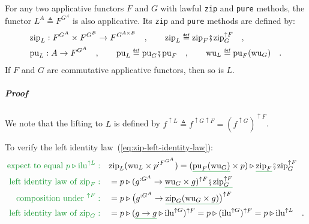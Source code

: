 For any two applicative functors $F$ and $G$ with lawful \lstinline!zip!
and \lstinline!pure! methods, the functor $L^{A}\triangleq F^{G^{A}}$
is also applicative. Its \lstinline!zip! and \lstinline!pure! methods
are defined by:
\begin{align*}
 & \text{zip}_{L}:F^{G^{A}}\times F^{G^{B}}\rightarrow F^{G^{A\times B}}\quad,\quad\quad\text{zip}_{L}\triangleq\text{zip}_{F}\bef\text{zip}_{G}^{\uparrow F}\quad,\\
 & \text{pu}_{L}:A\rightarrow F^{G^{A}}\quad,\quad\quad\text{pu}_{L}\triangleq\text{pu}_{G}\bef\text{pu}_{F}\quad,\quad\quad\text{wu}_{L}\triangleq\text{pu}_{F}(\text{wu}_{G})\quad.
\end{align*}
If $F$ and $G$ are commutative applicative functors, then so is
$L$.

\subparagraph{Proof}

We note that the lifting to $L$ is defined by $f^{\uparrow L}\triangleq f^{\uparrow G\uparrow F}=(f^{\uparrow G})^{\uparrow F}$.

To verify the left identity law~(\ref{eq:zip-left-identity-law}):
\begin{align*}
{\color{greenunder}\text{expect to equal }p\triangleright\text{ilu}^{\uparrow L}:}\quad & \text{zip}_{L}(\text{wu}_{L}\times p^{:F^{G^{A}}})=(\gunderline{\text{pu}_{F}(\text{wu}_{G})}\times p)\triangleright\gunderline{\text{zip}_{F}}\bef\text{zip}_{G}^{\uparrow F}\\
{\color{greenunder}\text{left identity law of }\text{zip}_{F}:}\quad & =p\triangleright(g^{:G^{A}}\rightarrow\gunderline{\text{wu}_{G}\times g)^{\uparrow F}\bef\text{zip}_{G}^{\uparrow F}}\\
{\color{greenunder}\text{composition under }^{\uparrow F}:}\quad & =p\triangleright\big(g^{:G^{A}}\rightarrow\gunderline{\text{zip}_{G}(\text{wu}_{G}\times g)}\big)^{\uparrow F}\\
{\color{greenunder}\text{left identity law of }\text{zip}_{G}:}\quad & =p\triangleright(\gunderline{g\rightarrow g}\triangleright\text{ilu}^{\uparrow G})^{\uparrow F}=p\triangleright(\text{ilu}^{\uparrow G})^{\uparrow F}=p\triangleright\text{ilu}^{\uparrow L}\quad.
\end{align*}

